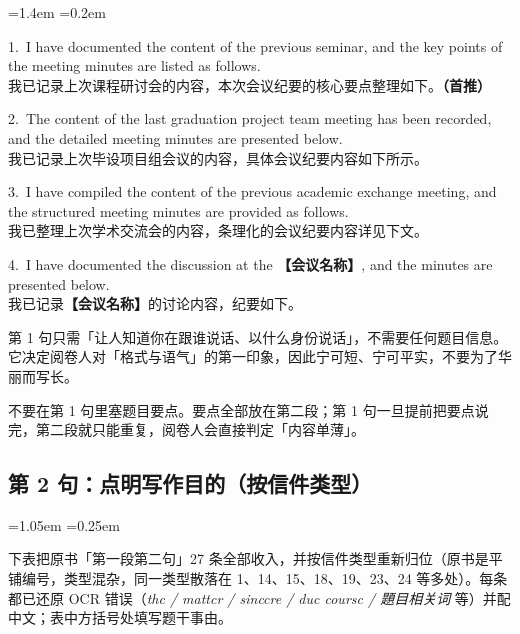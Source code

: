 \documentclass[11pt,a4paper]{ctexart}
\newcommand{\fillin}[1]{{\bfseries【#1】}}
\newcommand{\kw}[1]{{\bfseries\color{accent}#1}}
\newcommand{\zone}[1]{\par\addvspace{3pt}\noindent{\bfseries\color{accent}【雷区】}#1\par\addvspace{3pt}}
\newcommand{\rubric}[1]{\par\addvspace{3pt}\noindent{\bfseries【对标评分】}#1\par\addvspace{3pt}}
\newenvironment{note}{%
  \par\addvspace{5pt}%
  \begin{list}{}{\leftmargin=1.05em \rightmargin=0.25em \listparindent=0pt
    \itemindent=0pt \topsep=0pt \parsep=2pt \itemsep=2pt \partopsep=0pt}%
  \item\relax\small\color{ink}%
}{%
  \end{list}\addvspace{5pt}%
}
\newenvironment{eg}{%
  \par\addvspace{4pt}%
  \begin{list}{}{\leftmargin=1.4em \rightmargin=0.2em \listparindent=0pt
    \itemindent=0pt \topsep=0pt \parsep=2pt \itemsep=2pt \partopsep=0pt}%
  \item\relax
}{%
  \end{list}\addvspace{5pt}%
}
\begin{document}
\begin{eg}
1.\ I have documented the content of the previous seminar, and the key points of the meeting minutes are listed as follows.\\
我已记录上次课程研讨会的内容，本次会议纪要的核心要点整理如下。\kw{（首推）}

2.\ The content of the last graduation project team meeting has been recorded, and the detailed meeting minutes are presented below.\\
我已记录上次毕设项目组会议的内容，具体会议纪要内容如下所示。

3.\ I have compiled the content of the previous academic exchange meeting, and the structured meeting minutes are provided as follows.\\
我已整理上次学术交流会的内容，条理化的会议纪要内容详见下文。

4.\ I have documented the discussion at the \fillin{会议名称}, and the minutes are presented below.\\
我已记录\fillin{会议名称}的讨论内容，纪要如下。
\end{eg}

\rubric{第 1 句只需「让人知道你在跟谁说话、以什么身份说话」，不需要任何题目信息。它决定阅卷人对「格式与语气」的第一印象，因此宁可短、宁可平实，不要为了华丽而写长。}

\zone{不要在第 1 句里塞题目要点。要点全部放在第二段；第 1 句一旦提前把要点说完，第二段就只能重复，阅卷人会直接判定「内容单薄」。}


\subsection{第 2 句：点明写作目的（按信件类型）}

\begin{note}
下表把原书「第一段第二句」27 条全部收入，并按信件类型重新归位（原书是平铺编号，类型混杂，同一类型散落在 1、14、15、18、19、23、24 等多处）。每条都已还原 OCR 错误（\textit{thc / mattcr / sinccre / duc coursc / 題目相关词} 等）并配中文；表中方括号处填写题干事由。
\end{note}
\end{document}
